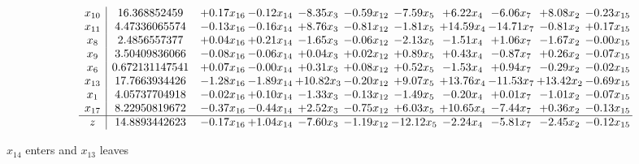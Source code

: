 \documentclass[9pt]{article}
\begin{document}
 \[\begin{array}{c| c c@{\hskip 2pt} c@{\hskip 2pt} c@{\hskip 2pt} c@{\hskip 2pt} c@{\hskip 2pt} c@{\hskip 2pt} c@{\hskip 2pt} c@{\hskip 2pt} c@{\hskip 2pt} }
 x_{10}   &  16.368852459 & +  0.17 x_{16} & -0.12 x_{14} & -8.35 x_{3} & -0.59 x_{12} & -7.59 x_{5} & +  6.22 x_{4} & -6.06 x_{7} & +  8.08 x_{2} & -0.23 x_{15}\\
 x_{11}   &  4.47336065574 & -0.13 x_{16} & -0.16 x_{14} & +  8.76 x_{3} & -0.81 x_{12} & -1.81 x_{5} & + 14.59 x_{4} & -14.71 x_{7} & -0.81 x_{2} & +  0.17 x_{15}\\
 x_{8}   &  2.4856557377 & +  0.04 x_{16} & +  0.21 x_{14} & -1.65 x_{3} & -0.06 x_{12} & -2.13 x_{5} & -1.51 x_{4} & +  1.06 x_{7} & -1.67 x_{2} & -0.00 x_{15}\\
 x_{9}   &  3.50409836066 & -0.08 x_{16} & -0.06 x_{14} & +  0.04 x_{3} & +  0.02 x_{12} & +  0.89 x_{5} & +  0.43 x_{4} & -0.87 x_{7} & +  0.26 x_{2} & -0.07 x_{15}\\
 x_{6}   &  0.672131147541 & +  0.07 x_{16} & -0.00 x_{14} & +  0.31 x_{3} & +  0.08 x_{12} & +  0.52 x_{5} & -1.53 x_{4} & +  0.94 x_{7} & -0.29 x_{2} & -0.02 x_{15}\\
 x_{13}   &  17.7663934426 & -1.28 x_{16} & -1.89 x_{14} & + 10.82 x_{3} & -0.20 x_{12} & +  9.07 x_{5} & + 13.76 x_{4} & -11.53 x_{7} & + 13.42 x_{2} & -0.69 x_{15}\\
 x_{1}   &  4.05737704918 & -0.02 x_{16} & +  0.10 x_{14} & -1.33 x_{3} & -0.13 x_{12} & -1.49 x_{5} & -0.20 x_{4} & +  0.01 x_{7} & -1.01 x_{2} & -0.07 x_{15}\\
 x_{17}   &  8.22950819672 & -0.37 x_{16} & -0.44 x_{14} & +  2.52 x_{3} & -0.75 x_{12} & +  6.03 x_{5} & + 10.65 x_{4} & -7.44 x_{7} & +  0.36 x_{2} & -0.13 x_{15}\\
\hline
z    &  14.8893442623 & -0.17 x_{16} & +  1.04 x_{14} & -7.60 x_{3} & -1.19 x_{12} & -12.12 x_{5} & -2.24 x_{4} & -5.81 x_{7} & -2.45 x_{2} & -0.12 x_{15}\\
\end{array}\]


 $ x_{14} $ enters and $ x_{13} $ leaves 
\end{document}

